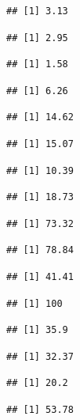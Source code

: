\documentclass[floatsintext,man]{apa6}
\theoremstyle{definition}
\theoremstyle{definition}
\theoremstyle{definition}
\theoremstyle{remark}
\begin{document}
\begin{verbatim}
## [1] 3.13
\end{verbatim}

\begin{verbatim}
## [1] 2.95
\end{verbatim}

\begin{verbatim}
## [1] 1.58
\end{verbatim}

\begin{verbatim}
## [1] 6.26
\end{verbatim}

\begin{verbatim}
## [1] 14.62
\end{verbatim}

\begin{verbatim}
## [1] 15.07
\end{verbatim}

\begin{verbatim}
## [1] 10.39
\end{verbatim}

\begin{verbatim}
## [1] 18.73
\end{verbatim}

\begin{verbatim}
## [1] 73.32
\end{verbatim}

\begin{verbatim}
## [1] 78.84
\end{verbatim}

\begin{verbatim}
## [1] 41.41
\end{verbatim}

\begin{verbatim}
## [1] 100
\end{verbatim}

\begin{verbatim}
## [1] 35.9
\end{verbatim}

\begin{verbatim}
## [1] 32.37
\end{verbatim}

\begin{verbatim}
## [1] 20.2
\end{verbatim}

\begin{verbatim}
## [1] 53.78
\end{verbatim}
\end{document}

